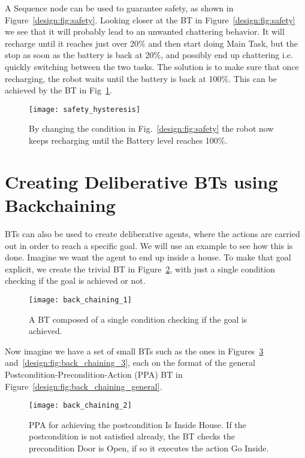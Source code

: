 A Sequence node can be used to guarantee safety, as shown in Figure~\ref{design:fig:safety}.
Looking closer at the BT in Figure~\ref{design:fig:safety} we see that it will probably lead to an unwanted chattering behavior. It will recharge until it reaches just over 20\%
and then start doing Main Task, but the stop as soon as the battery is back at 20\%,
and possibly end up chattering i.e. quickly switching between the two tasks.
The solution is to make sure that once recharging, the robot waits until the battery is back at 100\%. This can be achieved by the BT in Fig~\ref{design:fig:safety_hysteresis}.

\begin{figure}[h]
\centering
\texttt{[image: safety\_hysteresis]}
\caption{By changing the condition in Fig.~\ref{design:fig:safety} the robot now keeps recharging  until the Battery level reaches 100\%. }
\label{design:fig:safety_hysteresis}
\end{figure}

\section{Creating Deliberative BTs using Backchaining}
\label{design:sec:back_chaining}

BTs can also be used to create deliberative agents, where the actions are carried out in order to reach a specific goal. 
We will use an example to see how this is done.
Imagine we want the agent to end up inside a house. To make that goal explicit, we create the trivial BT in Figure~\ref{design:fig:back_chaining_1},
with just a single condition checking if the goal is achieved or not.


\begin{figure}[h]
\centering
\texttt{[image: back\_chaining\_1]}
\caption{A BT composed of a single condition checking if the goal is achieved.}
\label{design:fig:back_chaining_1}
\end{figure}

Now imagine we have a set of small BTs such as the ones in 
Figures~\ref{design:fig:back_chaining_2} and~\ref{design:fig:back_chaining_3}, each on the format of the general Postcondition-Precondition-Action (PPA) BT in 
Figure~\ref{design:fig:back_chaining_general}.


\begin{figure}[h]
\centering
\texttt{[image: back\_chaining\_2]}
\caption{PPA for achieving the postcondition Is Inside House. If the postcondition is not satisfied already, the BT checks the precondition Door is Open, if so it executes the action Go Inside.}
\label{design:fig:back_chaining_2}
\end{figure}

